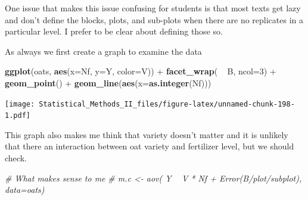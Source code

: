 \documentclass[]{book}
\newenvironment{Shaded}{\begin{snugshade}}{\end{snugshade}}
\newcommand{\KeywordTok}[1]{\textcolor[rgb]{0.13,0.29,0.53}{\textbf{{#1}}}}
\newcommand{\DataTypeTok}[1]{\textcolor[rgb]{0.13,0.29,0.53}{{#1}}}
\newcommand{\DecValTok}[1]{\textcolor[rgb]{0.00,0.00,0.81}{{#1}}}
\newcommand{\StringTok}[1]{\textcolor[rgb]{0.31,0.60,0.02}{{#1}}}
\newcommand{\CommentTok}[1]{\textcolor[rgb]{0.56,0.35,0.01}{\textit{{#1}}}}
\newcommand{\NormalTok}[1]{{#1}}
\theoremstyle{definition}
\theoremstyle{definition}
\theoremstyle{remark}
\begin{document}
One issue that makes this issue confusing for students is that most
texts get lazy and don't define the blocks, plots, and sub-plots when
there are no replicates in a particular level. I prefer to be clear
about defining those so.

\begin{Shaded}
\end{Shaded}

As always we first create a graph to examine the data

\begin{Shaded}
\begin{Highlighting}[]
\KeywordTok{ggplot}\NormalTok{(oats, }\KeywordTok{aes}\NormalTok{(}\DataTypeTok{x=}\NormalTok{Nf, }\DataTypeTok{y=}\NormalTok{Y, }\DataTypeTok{color=}\NormalTok{V)) +}
\StringTok{  }\KeywordTok{facet_wrap}\NormalTok{( ~}\StringTok{ }\NormalTok{B, }\DataTypeTok{ncol=}\DecValTok{3}\NormalTok{) +}
\StringTok{  }\KeywordTok{geom_point}\NormalTok{() +}
\StringTok{  }\KeywordTok{geom_line}\NormalTok{(}\KeywordTok{aes}\NormalTok{(}\DataTypeTok{x=}\KeywordTok{as.integer}\NormalTok{(Nf)))}
\end{Highlighting}
\end{Shaded}

\texttt{[image: Statistical\_Methods\_II\_files/figure-latex/unnamed-chunk-198-1.pdf]}

This graph also makes me think that variety doesn't matter and it is
unlikely that there an interaction between oat variety and fertilizer
level, but we should check.

\begin{Shaded}
\begin{Highlighting}[]
\CommentTok{#  What makes sense to me}
\CommentTok{# m.c <- aov( Y ~ V * Nf + Error(B/plot/subplot), data=oats)}
\end{Highlighting}
\end{Shaded}
\end{document}
